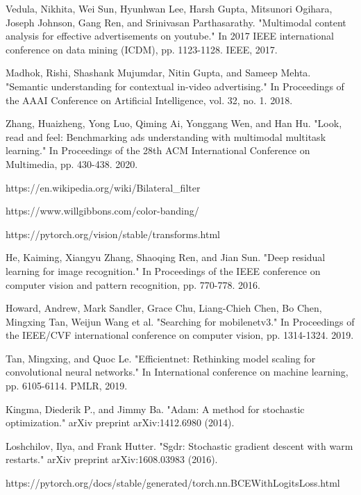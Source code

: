 \documentclass[conference]{IEEEtran}
\begin{document}
\begin{thebibliography}{00}
 Vedula, Nikhita, Wei Sun, Hyunhwan Lee, Harsh Gupta, Mitsunori Ogihara, Joseph Johnson, Gang Ren, and Srinivasan Parthasarathy. "Multimodal content analysis for effective advertisements on youtube." In 2017 IEEE international conference on data mining (ICDM), pp. 1123-1128. IEEE, 2017.

 Madhok, Rishi, Shashank Mujumdar, Nitin Gupta, and Sameep Mehta. "Semantic understanding for contextual in-video advertising." In Proceedings of the AAAI Conference on Artificial Intelligence, vol. 32, no. 1. 2018.

 Zhang, Huaizheng, Yong Luo, Qiming Ai, Yonggang Wen, and Han Hu. "Look, read and feel: Benchmarking ads understanding with multimodal multitask learning." In Proceedings of the 28th ACM International Conference on Multimedia, pp. 430-438. 2020.

 https://en.wikipedia.org/wiki/Bilateral\_filter

 https://www.willgibbons.com/color-banding/

 https://pytorch.org/vision/stable/transforms.html

 He, Kaiming, Xiangyu Zhang, Shaoqing Ren, and Jian Sun. "Deep residual learning for image recognition." In Proceedings of the IEEE conference on computer vision and pattern recognition, pp. 770-778. 2016.

 Howard, Andrew, Mark Sandler, Grace Chu, Liang-Chieh Chen, Bo Chen, Mingxing Tan, Weijun Wang et al. "Searching for mobilenetv3." In Proceedings of the IEEE/CVF international conference on computer vision, pp. 1314-1324. 2019.

 Tan, Mingxing, and Quoc Le. "Efficientnet: Rethinking model scaling for convolutional neural networks." In International conference on machine learning, pp. 6105-6114. PMLR, 2019.

 Kingma, Diederik P., and Jimmy Ba. "Adam: A method for stochastic optimization." arXiv preprint arXiv:1412.6980 (2014).

 Loshchilov, Ilya, and Frank Hutter. "Sgdr: Stochastic gradient descent with warm restarts." arXiv preprint arXiv:1608.03983 (2016).

 https://pytorch.org/docs/stable/generated/torch.nn.BCEWithLogitsLoss.html

\end{thebibliography}
\end{document}
